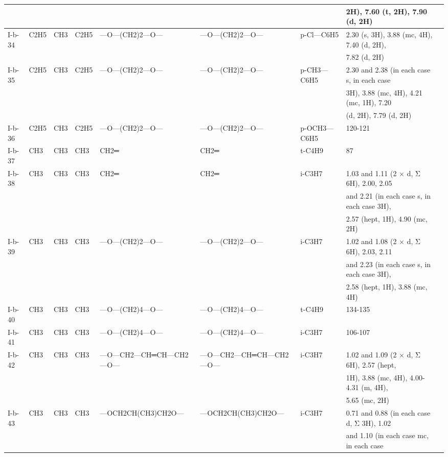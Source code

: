 \documentclass[11pt,a4paper]{article}
\begin{document}
\begin{table}[h]
\begin{tabular}{|l|l|l|l|l|l|l|l|l|}
 &  &  &  &  &  &  & 2H), 7.60 (t, 2H), 7.90 (d, 2H) &  \\ \hline
I-b-34 & C2H5 & CH3 & C2H5 & —O—(CH2)2—O— & —O—(CH2)2—O— & p-Cl—C6H5 & 2.30 (s, 3H), 3.88 (mc, 4H), 7.40 (d, 2H), &  \\ \hline
 &  &  &  &  &  &  & 7.82 (d, 2H) &  \\ \hline
I-b-35 & C2H5 & CH3 & C2H5 & —O—(CH2)2—O— & —O—(CH2)2—O— & p-CH3—C6H5 & 2.30 and 2.38 (in each case s, in each case &  \\ \hline
 &  &  &  &  &  &  & 3H), 3.88 (mc, 4H), 4.21 (mc, 1H), 7.20 &  \\ \hline
 &  &  &  &  &  &  & (d, 2H), 7.79 (d, 2H) &  \\ \hline
I-b-36 & C2H5 & CH3 & C2H5 & —O—(CH2)2—O— & —O—(CH2)2—O— & p-OCH3—C6H5 & 120-121 &  \\ \hline
I-b-37 & CH3 & CH3 & CH3 & CH2═ & CH2═ & t-C4H9 & 87 &  \\ \hline
I-b-38 & CH3 & CH3 & CH3 & CH2═ & CH2═ & i-C3H7 & 1.03 and 1.11 (2 × d, Σ 6H), 2.00, 2.05 &  \\ \hline
 &  &  &  &  &  &  & and 2.21 (in each case s, in each case 3H), &  \\ \hline
 &  &  &  &  &  &  & 2.57 (hept, 1H), 4.90 (mc, 2H) &  \\ \hline
I-b-39 & CH3 & CH3 & CH3 & —O—(CH2)2—O— & —O—(CH2)2—O— & i-C3H7 & 1.02 and 1.08 (2 × d, Σ 6H), 2.03, 2.11 &  \\ \hline
 &  &  &  &  &  &  & and 2.23 (in each case s, in each case 3H), &  \\ \hline
 &  &  &  &  &  &  & 2.58 (hept, 1H), 3.88 (mc, 4H) &  \\ \hline
I-b-40 & CH3 & CH3 & CH3 & —O—(CH2)4—O— & —O—(CH2)4—O— & t-C4H9 & 134-135 &  \\ \hline
I-b-41 & CH3 & CH3 & CH3 & —O—(CH2)4—O— & —O—(CH2)4—O— & i-C3H7 & 106-107 &  \\ \hline
I-b-42 & CH3 & CH3 & CH3 & —O—CH2—CH═CH—CH2—O— & —O—CH2—CH═CH—CH2—O— & i-C3H7 & 1.02 and 1.09 (2 × d, Σ 6H), 2.57 (hept, &  \\ \hline
 &  &  &  &  &  &  & 1H), 3.88 (mc, 4H), 4.00-4.31 (m, 4H), &  \\ \hline
 &  &  &  &  &  &  & 5.65 (mc, 2H) &  \\ \hline
I-b-43 & CH3 & CH3 & CH3 & —OCH2CH(CH3)CH2O— & —OCH2CH(CH3)CH2O— & i-C3H7 & 0.71 and 0.88 (in each case d, Σ 3H), 1.02 &  \\ \hline
 &  &  &  &  &  &  & and 1.10 (in each case mc, in each case &  \\ \hline

\end{tabular}
\end{table}
\end{document}
